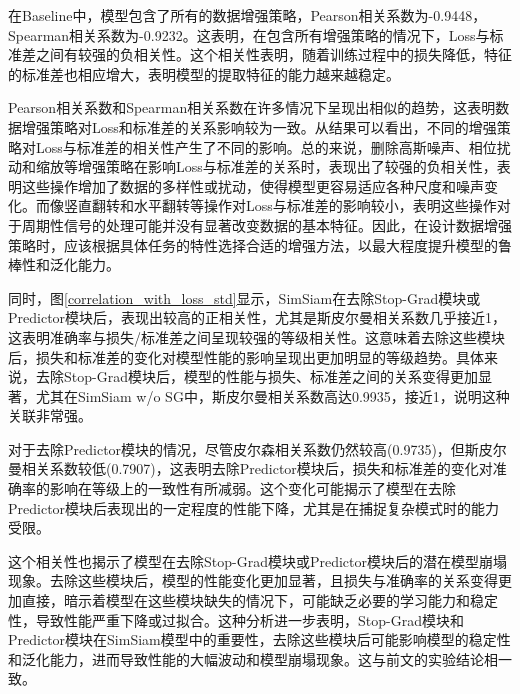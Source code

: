 \documentclass[master]{thesis-uestc}
\begin{document}
在Baseline中，模型包含了所有的数据增强策略，Pearson相关系数为-0.9448，Spearman相关系数为-0.9232。这表明，在包含所有增强策略的情况下，Loss与标准差之间有较强的负相关性。这个相关性表明，随着训练过程中的损失降低，特征的标准差也相应增大，表明模型的提取特征的能力越来越稳定。

Pearson相关系数和Spearman相关系数在许多情况下呈现出相似的趋势，这表明数据增强策略对Loss和标准差的关系影响较为一致。从结果可以看出，不同的增强策略对Loss与标准差的相关性产生了不同的影响。总的来说，删除高斯噪声、相位扰动和缩放等增强策略在影响Loss与标准差的关系时，表现出了较强的负相关性，表明这些操作增加了数据的多样性或扰动，使得模型更容易适应各种尺度和噪声变化。而像竖直翻转和水平翻转等操作对Loss与标准差的影响较小，表明这些操作对于周期性信号的处理可能并没有显著改变数据的基本特征。因此，在设计数据增强策略时，应该根据具体任务的特性选择合适的增强方法，以最大程度提升模型的鲁棒性和泛化能力。

同时，图\ref{correlation_with_loss_std}显示，SimSiam在去除Stop-Grad模块或Predictor模块后，表现出较高的正相关性，尤其是斯皮尔曼相关系数几乎接近1，这表明准确率与损失/标准差之间呈现较强的等级相关性。这意味着去除这些模块后，损失和标准差的变化对模型性能的影响呈现出更加明显的等级趋势。具体来说，去除Stop-Grad模块后，模型的性能与损失、标准差之间的关系变得更加显著，尤其在SimSiam w/o SG中，斯皮尔曼相关系数高达0.9935，接近1，说明这种关联非常强。

对于去除Predictor模块的情况，尽管皮尔森相关系数仍然较高(0.9735)，但斯皮尔曼相关系数较低(0.7907)，这表明去除Predictor模块后，损失和标准差的变化对准确率的影响在等级上的一致性有所减弱。这个变化可能揭示了模型在去除Predictor模块后表现出的一定程度的性能下降，尤其是在捕捉复杂模式时的能力受限。

这个相关性也揭示了模型在去除Stop-Grad模块或Predictor模块后的潜在模型崩塌现象。去除这些模块后，模型的性能变化更加显著，且损失与准确率的关系变得更加直接，暗示着模型在这些模块缺失的情况下，可能缺乏必要的学习能力和稳定性，导致性能严重下降或过拟合。这种分析进一步表明，Stop-Grad模块和Predictor模块在SimSiam模型中的重要性，去除这些模块后可能影响模型的稳定性和泛化能力，进而导致性能的大幅波动和模型崩塌现象。这与前文的实验结论相一致。
\end{document}
